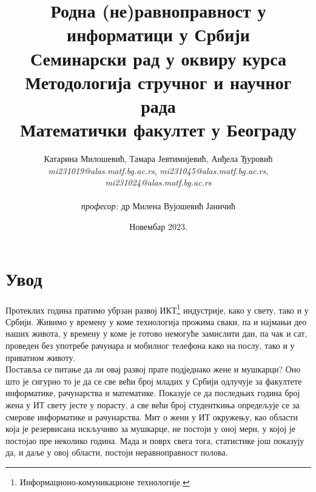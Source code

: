 \documentclass[a4paper]{article}
\begin{document}
\title{
\textbf{\LARGE{Родна (не)равноправност у информатици у Србији}}\\
\vspace{10}
\small{Семинарски рад у оквиру курса\\Методологија стручног и научног рада\\ Математички факултет у Београду}}

\author{Катарина Милошевић,  Тамара Јевтимијевић, Анђела Ђуровић \\ 
        \textit{mi231019@alas.matf.bg.ac.rs}, \textit{mi231045@alas.matf.bg.ac.rs}, 
        \textit{mi231024@alas.matf.bg.ac.rs} \\\\
        \textit{професор:} др Милена Вујошевић Јаничић}

\date{Новембар 2023.}

\maketitle
\thispagestyle{empty}

\renewcommand{\abstractname}{Сажетак}


\tableofcontents

\section{Увод}
\label{sec:uvod}

Протеклих година пратимо убрзан развој ИКТ\footnote{Информационо-комуникационе технологије.} 
индустрије, како у свету, тако и у Србији. Живимо у времену у коме технологија прожима сваки, па и
најмањи део наших живота, у времену у коме је готово немогуће замислити дан, па чак и сат, 
проведен без употребе рачунара и мобилног телефона како на послу, тако и у приватном животу. \\
Поставља се питање да ли овај развој прате подједнако жене и мушкарци? 
Оно што је сигурно то је да се све већи број младих у Србији одлучује за факултете информатике, 
рачунарства и математике. Показује се да последњих година број жена у ИТ свету јесте у порасту, а 
све већи број студенткиња опредељује се за смерове информатике и рачунарства. Мит о 
жени у ИТ окружењу, као области која је резервисана искључиво за мушкарце, не постоји у оној мери,
у којој је постојао пре неколико година. Мада и поврх свега тога, статистике још показују да, и 
даље у овој области, постоји неравноправност полова. 
\end{document}
